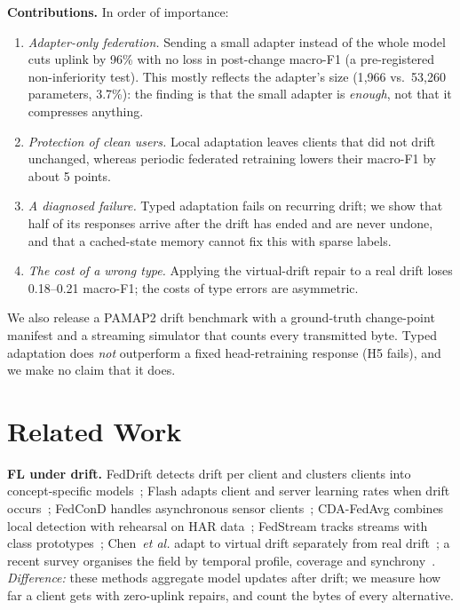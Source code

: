 \documentclass[conference]{IEEEtran}
\newcommand{\fone}{macro-F1}
\begin{document}
\textbf{Contributions.} In order of importance:
\begin{enumerate}
\item \emph{Adapter-only federation.} Sending a small adapter instead of the whole model cuts uplink by 96\% with no loss in post-change \fone{} (a pre-registered non-inferiority test). This mostly reflects the adapter's size (1{,}966 vs.\ 53{,}260 parameters, 3.7\%): the finding is that the small adapter is \emph{enough}, not that it compresses anything.
\item \emph{Protection of clean users.} Local adaptation leaves clients that did not drift unchanged, whereas periodic federated retraining lowers their \fone{} by about 5 points.
\item \emph{A diagnosed failure.} Typed adaptation fails on recurring drift; we show that half of its responses arrive after the drift has ended and are never undone, and that a cached-state memory cannot fix this with sparse labels.
\item \emph{The cost of a wrong type.} Applying the virtual-drift repair to a real drift loses 0.18--0.21 \fone{}; the costs of type errors are asymmetric.
\end{enumerate}
We also release a PAMAP2 drift benchmark with a ground-truth change-point manifest and a streaming simulator that counts every transmitted byte. Typed adaptation does \emph{not} outperform a fixed head-retraining response (H5 fails), and we make no claim that it does.

\section{Related Work}
\textbf{FL under drift.} FedDrift detects drift per client and clusters clients into concept-specific models~\cite{jothimurugesan2023feddrift}; Flash adapts client and server learning rates when drift occurs~\cite{panchal2023flash}; FedConD handles asynchronous sensor clients~\cite{chen2021fedcond}; CDA-FedAvg combines local detection with rehearsal on HAR data~\cite{casado2022cdafedavg}; FedStream tracks streams with class prototypes~\cite{mawuli2023fedstream}; Chen~\emph{et al.} adapt to virtual drift separately from real drift~\cite{chen2025virtual}; a recent survey organises the field by temporal profile, coverage and synchrony~\cite{mahdi2025fdal}. \emph{Difference:} these methods aggregate model updates after drift; we measure how far a client gets with zero-uplink repairs, and count the bytes of every alternative.
\end{document}
